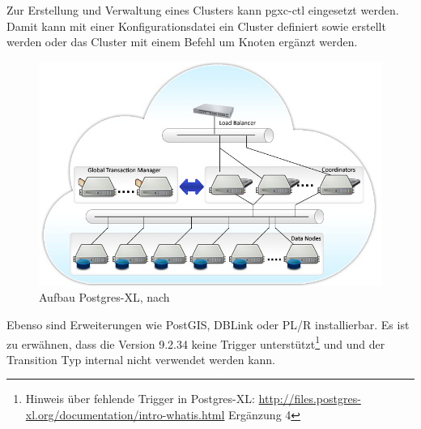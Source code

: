 Zur Erstellung und Verwaltung eines Clusters kann pgxc-ctl eingesetzt werden.
Damit kann mit einer Konfigurationsdatei ein Cluster definiert sowie erstellt werden oder das Cluster mit einem Befehl um Knoten ergänzt werden.
\begin{figure}[h!]
\centering
\includegraphics[width=.7\textwidth]{Abbildungen/postgresxl-structure.jpg}
\caption[Aufbau Postgres-XL]{Aufbau Postgres-XL, nach \cite{website:postgresxl-overview}}
\label{fig:postgresxl}
\end{figure}
Ebenso sind Erweiterungen wie PostGIS, DBLink oder PL/R installierbar.
Es ist zu erwähnen, dass die Version 9.2.34 keine Trigger unterstützt\footnote{Hinweis über fehlende Trigger in Postgres-XL: \url{http://files.postgres-xl.org/documentation/intro-whatis.html} Ergänzung 4} und und der Transition Typ internal nicht verwendet werden kann.

